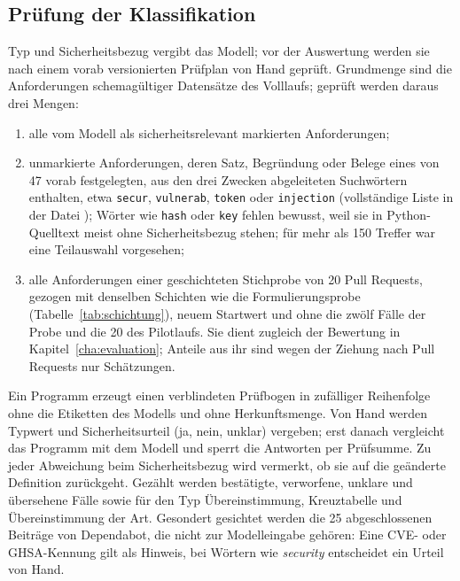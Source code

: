 \documentclass[11pt,a4paper]{report}
\begin{document}
\subsection{Prüfung der Klassifikation}
\label{subsec:pruefung-klassifikation}

Typ und Sicherheitsbezug vergibt das Modell; vor der Auswertung werden
sie nach einem vorab versionierten Prüfplan von Hand geprüft.
Grundmenge sind die Anforderungen schemagültiger Datensätze des
Volllaufs; geprüft werden daraus drei Mengen:

\begin{enumerate}
  \item alle vom Modell als sicherheitsrelevant markierten
    Anforderungen;
  \item unmarkierte Anforderungen, deren Satz, Begründung oder Belege
    eines von 47 vorab festgelegten, aus den drei Zwecken abgeleiteten
    Suchwörtern enthalten, etwa
    \texttt{secur}, \texttt{vulnerab}, \texttt{token} oder
    \texttt{injection} (vollständige Liste in der Datei
    ); Wörter wie
    \texttt{hash} oder \texttt{key} fehlen bewusst, weil sie in
    Python-Quelltext meist ohne Sicherheitsbezug stehen; für mehr als
    150 Treffer war eine Teilauswahl vorgesehen;
  \item alle Anforderungen einer geschichteten Stichprobe von 20 Pull
    Requests, gezogen mit denselben Schichten wie die Formulierungsprobe
    (Tabelle~\ref{tab:schichtung}), neuem Startwert und ohne die zwölf
    Fälle der Probe und die 20 des Pilotlaufs. Sie dient zugleich der
    Bewertung in Kapitel~\ref{cha:evaluation}; Anteile aus ihr sind
    wegen der Ziehung nach Pull Requests nur Schätzungen.
\end{enumerate}

Ein Programm erzeugt einen verblindeten Prüfbogen in zufälliger
Reihenfolge ohne die Etiketten des Modells und ohne Herkunftsmenge. Von
Hand werden Typwert und Sicherheitsurteil (ja, nein, unklar) vergeben;
erst danach vergleicht das Programm mit dem Modell und sperrt die
Antworten per Prüfsumme. Zu jeder Abweichung beim Sicherheitsbezug wird
vermerkt, ob sie auf die geänderte Definition zurückgeht. Gezählt werden
bestätigte, verworfene, unklare und übersehene Fälle sowie für den Typ
Übereinstimmung, Kreuztabelle und Übereinstimmung der Art. Gesondert
gesichtet werden die 25 abgeschlossenen Beiträge von Dependabot, die
nicht zur Modelleingabe gehören: Eine CVE- oder GHSA-Kennung gilt als
Hinweis, bei Wörtern wie \emph{security} entscheidet ein Urteil von
Hand.
\end{document}
